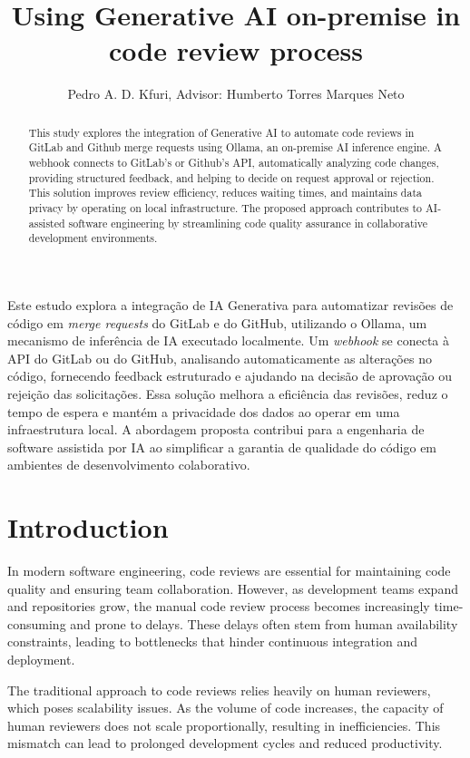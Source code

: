 \documentclass[12pt]{article}
\title{Using Generative AI on-premise in code review process}
\author{Pedro A. D. Kfuri\inst{1}, Advisor: Humberto Torres Marques Neto\inst{1} }
\begin{document}
 
\maketitle

\begin{resumo}
Este estudo explora a integração de IA Generativa para automatizar revisões de código em \textit{merge requests} do GitLab e do GitHub, utilizando o Ollama, um mecanismo de inferência de IA executado localmente. Um \textit{webhook} se conecta à API do GitLab ou do GitHub, analisando automaticamente as alterações no código, fornecendo feedback estruturado e ajudando na decisão de aprovação ou rejeição das solicitações. Essa solução melhora a eficiência das revisões, reduz o tempo de espera e mantém a privacidade dos dados ao operar em uma infraestrutura local. A abordagem proposta contribui para a engenharia de software assistida por IA ao simplificar a garantia de qualidade do código em ambientes de desenvolvimento colaborativo.
\end{resumo}

\begin{abstract}
This study explores the integration of Generative AI to automate code reviews in GitLab and Github merge requests using Ollama, an on-premise AI inference engine. A webhook connects to GitLab's or Github's API, automatically analyzing code changes, providing structured feedback, and helping to decide on request approval or rejection. This solution improves review efficiency, reduces waiting times, and maintains data privacy by operating on local infrastructure. The proposed approach contributes to AI-assisted software engineering by streamlining code quality assurance in collaborative development environments.
\end{abstract}

\section{Introduction}
In modern software engineering, code reviews are essential for maintaining code quality and ensuring team collaboration. However, as development teams expand and repositories grow, the manual code review process becomes increasingly time-consuming and prone to delays. These delays often stem from human availability constraints, leading to bottlenecks that hinder continuous integration and deployment. \cite{codereviewStudy}

The traditional approach to code reviews relies heavily on human reviewers, which poses scalability issues. As the volume of code increases, the capacity of human reviewers does not scale proportionally, resulting in inefficiencies. This mismatch can lead to prolonged development cycles and reduced productivity. \cite{integratingAIDevops}
\end{document}

